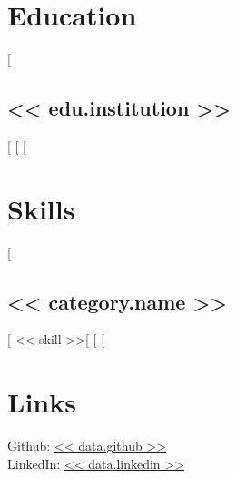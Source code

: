 \documentclass[letterpaper]{deedy-resume}
\begin{document}
\lastupdated 


\begin{minipage}[t]{0.33\textwidth} 
\section{Education} 
[%
\subsection{<< edu.institution >>}
[%
[%
\sectionsep 
[%

\section{Skills}
[%
\subsection{<< category.name >>}
[%
<< skill >>[%
[%
\sectionsep
[%

\section{Links} 
Github: \href{https://<< data.github >>}{<< data.github >>} \\
LinkedIn: \href{https://<< data.linkedin >>}{<< data.linkedin >>}
\sectionsep 
\end{minipage} 
\hfill
\end{document}
